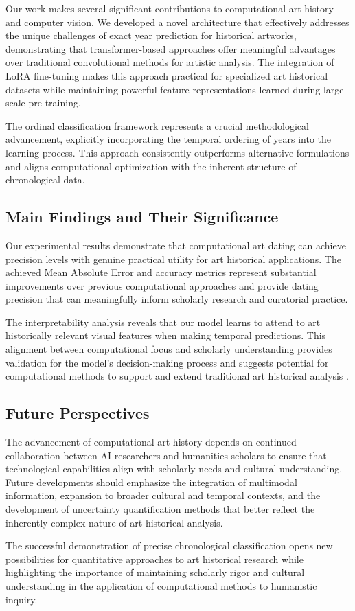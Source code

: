 \documentclass[10pt,twocolumn,letterpaper]{article}
\begin{document}
Our work makes several significant contributions to computational art history and computer vision. We developed a novel architecture that effectively addresses the unique challenges of exact year prediction for historical artworks, demonstrating that transformer-based approaches offer meaningful advantages over traditional convolutional methods for artistic analysis. The integration of LoRA fine-tuning makes this approach practical for specialized art historical datasets while maintaining powerful feature representations learned during large-scale pre-training.

The ordinal classification framework represents a crucial methodological advancement, explicitly incorporating the temporal ordering of years into the learning process. This approach consistently outperforms alternative formulations and aligns computational optimization with the inherent structure of chronological data.

\subsection{Main Findings and Their Significance}

Our experimental results demonstrate that computational art dating can achieve precision levels with genuine practical utility for art historical applications. The achieved Mean Absolute Error and accuracy metrics represent substantial improvements over previous computational approaches \cite{Mensink14, Strezoski18} and provide dating precision that can meaningfully inform scholarly research and curatorial practice.

The interpretability analysis reveals that our model learns to attend to art historically relevant visual features when making temporal predictions. This alignment between computational focus and scholarly understanding provides validation for the model's decision-making process and suggests potential for computational methods to support and extend traditional art historical analysis \cite{Elgammal18}.

\subsection{Future Perspectives}

The advancement of computational art history depends on continued collaboration between AI researchers and humanities scholars to ensure that technological capabilities align with scholarly needs and cultural understanding. Future developments should emphasize the integration of multimodal information, expansion to broader cultural and temporal contexts, and the development of uncertainty quantification methods that better reflect the inherently complex nature of art historical analysis.

The successful demonstration of precise chronological classification opens new possibilities for quantitative approaches to art historical research while highlighting the importance of maintaining scholarly rigor and cultural understanding in the application of computational methods to humanistic inquiry.

{\small


}
\end{document}
